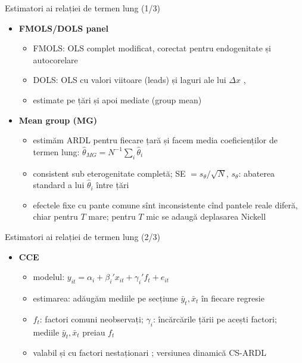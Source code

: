 \begin{frame}{Estimatori ai relației de termen lung (1/3)}
\itemsize{\small}
\begin{itemize}
    \item \textbf{FMOLS/DOLS panel} 
    \begin{itemize}
        \item FMOLS: OLS complet modificat, corectat pentru endogenitate și autocorelare 
        \item DOLS: OLS cu valori viitoare (leads) și laguri ale lui $\Delta x$ , 
        \item estimate pe țări și apoi mediate (group mean)
    \end{itemize}
    \item \textbf{Mean group (MG)} 
    \begin{itemize}
        \item estimăm ARDL pentru fiecare țară și facem media coeficienților de termen lung: $\hat\theta_{MG} = N^{-1}\sum_i\hat\theta_i$
        \item consistent sub eterogenitate completă; SE $= s_\theta/\sqrt N$, $s_\theta$: abaterea standard a lui $\hat\theta_i$ între țări
        \item efectele fixe cu pante comune sînt inconsistente cînd pantele reale diferă, chiar pentru $T$ mare; pentru $T$ mic se adaugă deplasarea Nickell 
    \end{itemize}
\end{itemize}
\end{frame}

\begin{frame}{Estimatori ai relației de termen lung (2/3)}
\itemsize{\small}
\begin{itemize}
    \item \textbf{CCE} 
    \begin{itemize}
        \item modelul: $y_{it} = \alpha_i + \beta_i'x_{it} + \gamma_i'f_t + e_{it}$
        \item estimarea: adăugăm mediile pe secțiune $\bar y_t, \bar x_t$ în fiecare regresie
        \item $f_t$: factori comuni neobservați; $\gamma_i$: încărcările țării pe acești factori; mediile $\bar y_t, \bar x_t$ preiau $f_t$
        \item valabil și cu factori nestaționari ; versiunea dinamică CS-ARDL 
    \end{itemize}
\end{itemize}
\end{frame}

